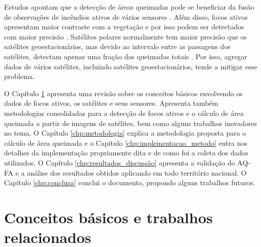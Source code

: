 \documentclass[cic,tc]{iiufrgs}
\begin{document}



Estudos apontam que a detecção de áreas queimadas pode se beneficiar da fusão de observações de incêndios ativos de vários sensores \citep{giglio2010assessing}. Além disso, focos ativos apresentam maior contraste com a vegetação e por isso podem ser detectados com maior precisão \citep{GIGLIO2016}. Satélites polares normalmente tem maior precisão que os satélites geoestacionários, mas devido ao intervalo entre as passagens dos satélites, detectam apenas uma fração das queimadas totais \citep{HANTSON2013, giglio2009active}. Por isso, agregar dados de vários satélites, incluindo satélites geoestacionários, tende a mitigar esse problema.



O Capítulo \ref{chp:conceitos_basicos} apresenta uma revisão sobre os conceitos básicos envolvendo os dados de focos ativos, os satélites e seus sensores. Apresenta também metodologias consolidadas para a detecção de focos ativos e o cálculo de área queimada a partir de imagens de satélites, bem como alguns trabalhos inovadores no tema. O Capítulo \ref{chp:metodologia} explica a metodologia proposta para o cálculo de área queimada e o Capítulo \ref{chp:implementacao_metodo} entra nos detalhes da implementação propriamente dita e de como foi a coleta dos dados utilizados. O Capítulo \ref{chp:resultados_discussão} apresenta a validação do AQ-FA e a análise dos resultados obtidos aplicando em todo território nacional. O Capítulo \ref{chp:conclusa} conclui o documento, propondo alguns trabalhos futuros.




\chapter{Conceitos básicos e trabalhos relacionados}
\label{chp:conceitos_basicos}
\end{document}
